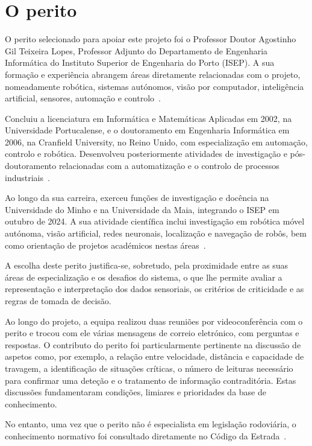 \chapter{O perito}
\label{cap:perito}

O perito selecionado para apoiar este projeto foi o Professor Doutor Agostinho
Gil Teixeira Lopes, Professor Adjunto do Departamento de Engenharia Informática
do Instituto Superior de Engenharia do Porto (ISEP). A sua formação e
experiência abrangem áreas diretamente relacionadas com o projeto, nomeadamente
robótica, sistemas autónomos, visão por computador, inteligência artificial,
sensores, automação e controlo~\cite{cienciavitae}.

Concluiu a licenciatura em Informática e Matemáticas Aplicadas em 2002, na
Universidade Portucalense, e o doutoramento em Engenharia Informática em 2006,
na Cranfield University, no Reino Unido, com especialização em automação,
controlo e robótica. Desenvolveu posteriormente atividades de investigação e
pós-doutoramento relacionadas com a automatização e o controlo de processos
industriais~\cite{cienciavitae,lopes2006}.

Ao longo da sua carreira, exerceu funções de investigação e docência na
Universidade do Minho e na Universidade da Maia, integrando o ISEP em outubro de
2024. A sua atividade científica inclui investigação em robótica móvel autónoma,
visão artificial, redes neuronais, localização e navegação de robôs, bem como
orientação de projetos académicos nestas áreas~\cite{cienciavitae,isepcontrato,uminhoteses}.

A escolha deste perito justifica-se, sobretudo, pela proximidade entre as suas
áreas de especialização e os desafios do sistema, o que lhe permite avaliar a
representação e interpretação dos dados sensoriais, os critérios de criticidade e
as regras de tomada de decisão.

Ao longo do projeto, a equipa realizou duas reuniões por videoconferência com o
perito e trocou com ele várias mensagens de correio eletrónico, com perguntas e
respostas. O contributo do perito foi particularmente pertinente na discussão de
aspetos como, por exemplo, a relação entre velocidade, distância e capacidade de
travagem, a identificação de situações críticas, o número de leituras necessário
para confirmar uma deteção e o tratamento de informação contraditória. Estas
discussões fundamentaram condições, limiares e prioridades da base de
conhecimento.

No entanto, uma vez que o perito não é especialista em legislação rodoviária, o
conhecimento normativo foi consultado diretamente no Código da Estrada~\cite{codigoestrada}.
